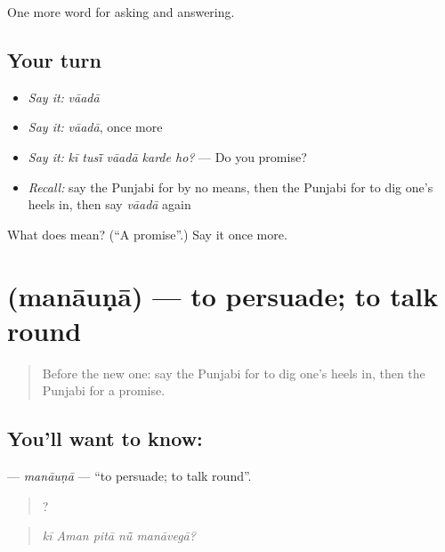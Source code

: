 \begin{grammarlens}[title={What you've built}]
One more word for asking and answering.
\end{grammarlens}

\subsection*{Your turn}
\begin{itemize}
\raggedright
  \item \emph{Say it:} \emph{vāadā}
  \item \emph{Say it:} \emph{vāadā}, once more
  \item \emph{Say it:} \emph{kī tusī̃ vāadā karde ho?} — Do you promise?
  \item \emph{Recall:} say the Punjabi for by no means, then the Punjabi for to dig one's heels in, then say \emph{vāadā} again
\end{itemize}

\begin{tcolorbox}[breakable,colback=teal!4,colframe=teal!35!black,title={Before you move on}]
What does  mean? (\textquotedblleft{}A promise\textquotedblright{}.) Say it once more.
\end{tcolorbox}
\section[\texorpdfstring{\pa{ਮਨਾਉਣਾ} (manāuṇā)}{ਮਨਾਉਣਾ (manāuṇā)}]{ (manāuṇā) — to persuade; to talk round}

\label{lesson:PA-C340-manauna}



\begin{quote}
Before the new one: say the Punjabi for to dig one's heels in, then the Punjabi for a promise.
\end{quote}

\subsection*{You'll want to know: }
\textbf{} — \emph{manāuṇā} — \textquotedblleft{}to persuade; to talk round\textquotedblright{}.

\begin{quote}
    ?
\end{quote}

\begin{quote}
\emph{kī Aman pitā nū̃ manāvegā?}
\end{quote}

